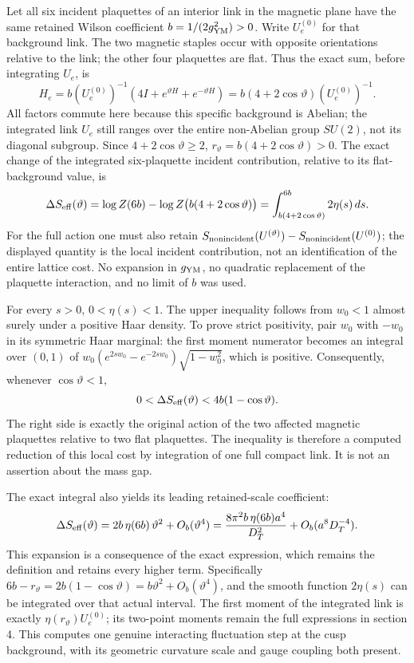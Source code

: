 \documentclass[
  11pt,
]{article}
\begin{document}
Let all six incident plaquettes of an interior link in the magnetic
plane have the same retained Wilson coefficient
\(b=1/(2g_{\rm YM}^2)>0\). Write \(U_e^{(0)}\) for that background link.
The two magnetic staples occur with opposite orientations relative to
the link; the other four plaquettes are flat. Thus the exact sum, before
integrating \(U_e\), is \[
 H_e=b(U_e^{(0)})^{-1}
       (4I+e^{\vartheta H}+e^{-\vartheta H})
     =b(4+2\cos\vartheta)(U_e^{(0)})^{-1}.
\] All factors commute here because this specific background is Abelian;
the integrated link \(U_e\) still ranges over the entire non-Abelian
group \(SU(2)\), not its diagonal subgroup. Since
\(4+2\cos\vartheta\geq2\), \(r_\vartheta=b(4+2\cos\vartheta)>0\). The
exact change of the integrated six-plaquette incident contribution,
relative to its flat-background value, is \[
 \Delta S_{\rm eff}(\vartheta)
 =\log Z(6b)-\log Z\bigl(b(4+2\cos\vartheta)\bigr)
 =\int_{b(4+2\cos\vartheta)}^{6b}2\eta(s)\,ds.
\] For the full action one must also retain
\(S_{\rm nonincident}(U^{(\vartheta)})-
S_{\rm nonincident}(U^{(0)})\); the displayed quantity is the local
incident contribution, not an identification of the entire lattice cost.
No expansion in \(g_{\rm YM}\), no quadratic replacement of the
plaquette interaction, and no limit of \(b\) was used.

For every \(s>0\), \(0<\eta(s)<1\). The upper inequality follows from
\(w_0<1\) almost surely under a positive Haar density. To prove strict
positivity, pair \(w_0\) with \(-w_0\) in its symmetric Haar marginal:
the first moment numerator becomes an integral over \((0,1)\) of
\(w_0(e^{2sw_0}-e^{-2sw_0})\sqrt{1-w_0^2}\), which is positive.
Consequently, whenever \(\cos\vartheta<1\), \[
 0<\Delta S_{\rm eff}(\vartheta)
       <4b(1-\cos\vartheta).
\] The right side is exactly the original action of the two affected
magnetic plaquettes relative to two flat plaquettes. The inequality is
therefore a computed reduction of this local cost by integration of one
full compact link. It is not an assertion about the mass gap.

The exact integral also yields its leading retained-scale coefficient:
\[
 \Delta S_{\rm eff}(\vartheta)
   =2b\,\eta(6b)\,\vartheta^2+O_b(\vartheta^4)
   =\frac{8\pi^2 b\,\eta(6b)a^4}{D_T^2}
       +O_b(a^8D_T^{-4}).
\] This expansion is a consequence of the exact expression, which
remains the definition and retains every higher term. Specifically
\(6b-r_\vartheta=2b(1-\cos\vartheta)
=b\vartheta^2+O_b(\vartheta^4)\), and the smooth function \(2\eta(s)\)
can be integrated over that actual interval. The first moment of the
integrated link is exactly \(\eta(r_\vartheta)U_e^{(0)}\); its two-point
moments remain the full expressions in section 4. This computes one
genuine interacting fluctuation step at the cusp background, with its
geometric curvature scale and gauge coupling both present.
\end{document}
